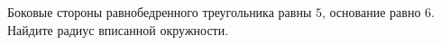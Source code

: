 \begin{ex}
	\begin{condition}
		Боковые стороны равнобедренного треугольника равны \( 5 \), основание равно \( 6 \). Найдите радиус вписанной окружности.
	\end{condition}
\end{ex}